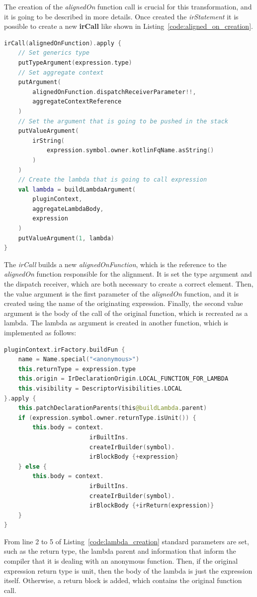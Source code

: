 The creation of the \textit{alignedOn} function call is crucial for this transformation, and it is going to be described in more details.\newline 
Once created the \textit{irStatement} it is possible to create a new \textbf{irCall} like shown in Listing~\ref{code:aligned_on_creation}.
\begin{lstlisting}[caption={Generation of the \textit{alignedOn} function call in Listing~\ref{code:alignedOn_compiler_plugin}}, captionpos=b, language=Kotlin, label={code:aligned_on_creation}]
irCall(alignedOnFunction).apply {
    // Set generics type
    putTypeArgument(expression.type)
    // Set aggregate context
    putArgument(
        alignedOnFunction.dispatchReceiverParameter!!,
        aggregateContextReference
    )
    // Set the argument that is going to be pushed in the stack
    putValueArgument(
        irString(
            expression.symbol.owner.kotlinFqName.asString()
        )
    )
    // Create the lambda that is going to call expression
    val lambda = buildLambdaArgument(
        pluginContext,
        aggregateLambdaBody,
        expression
    )
    putValueArgument(1, lambda)
}
\end{lstlisting}
The \textit{irCall} builds a new \textit{alignedOnFunction}, which is the reference to the \textit{alignedOn} function responsible for the alignment. It is set the type argument and the dispatch receiver, which are both necessary to create a correct element. Then, the value argument is the first parameter of the \textit{alignedOn} function, and it is created using the name of the originating expression. Finally, the second value argument is the body of the call of the original function, which is recreated as a lambda.\newline
The lambda as argument is created in another function, which is implemented as follows:
\begin{lstlisting}[caption={Generation of the lambda body of the \textit{alignedOn} function call in Listing~\ref{code:alignedOn_compiler_plugin}}, captionpos=b, language=Kotlin, label={code:lambda_creation}]
pluginContext.irFactory.buildFun {
    name = Name.special("<anonymous>")
    this.returnType = expression.type
    this.origin = IrDeclarationOrigin.LOCAL_FUNCTION_FOR_LAMBDA
    this.visibility = DescriptorVisibilities.LOCAL
}.apply {
    this.patchDeclarationParents(this@buildLambda.parent)
    if (expression.symbol.owner.returnType.isUnit()) {
        this.body = context.
                        irBuiltIns.
                        createIrBuilder(symbol).
                        irBlockBody {+expression}
    } else {
        this.body = context.
                        irBuiltIns.
                        createIrBuilder(symbol).
                        irBlockBody {+irReturn(expression)}
    }
}
\end{lstlisting}
From line 2 to 5 of Listing~\ref{code:lambda_creation} standard parameters are set, such as the return type, the lambda parent and information that inform the compiler that it is dealing with an anonymous function. Then, if the original expression return type is unit, then the body of the lambda is just the expression itself. Otherwise, a return block is added, which contains the original function call.

